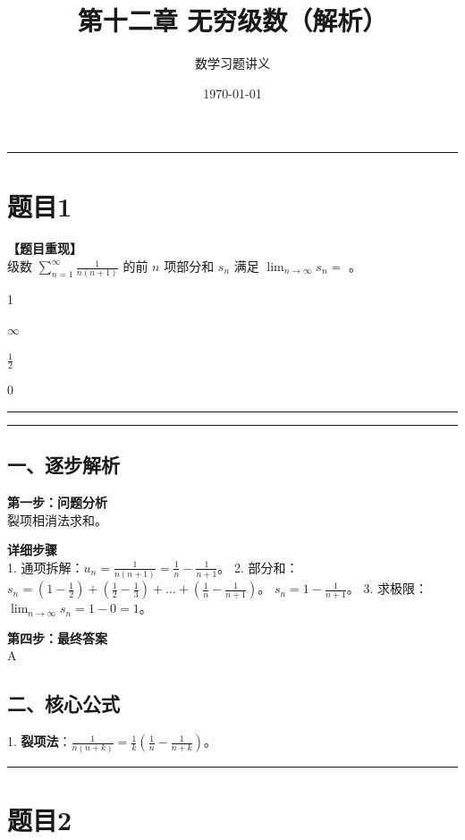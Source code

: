 \documentclass[12pt, a4paper]{ctexart}
\newcommand{\TopSeparator}{
    \par\noindent\rule{\textwidth}{1.5pt}\vspace{0.5em} %
}
\newcommand{\AnalysisSeparator}{
    \par\noindent\rule{\textwidth}{0.5pt}\vspace{0.2em}\hrule\vspace{0.5em} %
}
\newenvironment{RedAnalysis}{
    \par
    \color{red} %
}{
    \par
    \color{black} %
}
\newcommand{\choicesFour}[4]{
    \begin{enumerate}[label=\Alph*., itemsep=0pt, parsep=0pt, topsep=5pt, labelsep=0.5em]
        \begin{minipage}{0.22\linewidth} \item #1 \end{minipage}
        \begin{minipage}{0.22\linewidth} \item #2 \end{minipage}
        \begin{minipage}{0.22\linewidth} \item #3 \end{minipage}
        \begin{minipage}{0.22\linewidth} \item #4 \end{minipage}
    \end{enumerate}
}
\begin{document}
\title{\textbf{第十二章 无穷级数（解析）}}
\author{数学习题讲义}
\date{\today}
\maketitle

\TopSeparator
\section*{题目1}

\textbf{【题目重现】} \\
级数 $ \sum_{n=1}^{\infty}\frac{1}{n(n+1)} $ 的前 $n$ 项部分和 $ s_{n} $ 满足 $ \lim_{n\to\infty}s_{n}= $ \underline{\hspace{1cm}}。
\choicesFour{1}{$ \infty $}{$ \frac{1}{2} $}{0}

\AnalysisSeparator

\begin{RedAnalysis}

\subsection*{一、逐步解析}

\textbf{第一步：问题分析} \\
裂项相消法求和。

\textbf{详细步骤} \\
1. 通项拆解：$u_n = \frac{1}{n(n+1)} = \frac{1}{n} - \frac{1}{n+1}$。
2. 部分和：
   $s_n = (1 - \frac{1}{2}) + (\frac{1}{2} - \frac{1}{3}) + \dots + (\frac{1}{n} - \frac{1}{n+1})$。
   $s_n = 1 - \frac{1}{n+1}$。
3. 求极限：
   $\lim_{n \to \infty} s_n = 1 - 0 = 1$。

\textbf{第四步：最终答案} \\
A

\subsection*{二、核心公式}
1. \textbf{裂项法}：$\frac{1}{n(n+k)} = \frac{1}{k}(\frac{1}{n} - \frac{1}{n+k})$。

\end{RedAnalysis}

\vspace{2em}

\TopSeparator
\section*{题目2}
\end{document}
